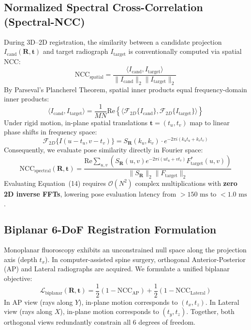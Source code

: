 \documentclass[journal,twocolumn]{IEEEtran}
\begin{document}
\subsection{Normalized Spectral Cross-Correlation (Spectral-NCC)}
During 3D--2D registration, the similarity between a candidate projection $I_{\mathrm{cand}}(\mathbf{R}, \mathbf{t})$ and target radiograph $I_{\mathrm{target}}$ is conventionally computed via spatial NCC:
\begin{equation}
\mathrm{NCC}_{\mathrm{spatial}} = \frac{\langle I_{\mathrm{cand}}, I_{\mathrm{target}} \rangle}{\|I_{\mathrm{cand}}\|_2 \|I_{\mathrm{target}}\|_2}
\end{equation}
By Parseval's Plancherel Theorem, spatial inner products equal frequency-domain inner products:
\begin{equation}
\langle I_{\mathrm{cand}}, I_{\mathrm{target}} \rangle = \frac{1}{M N} \mathrm{Re} \left\{ \langle \mathcal{F}_{2D}\{I_{\mathrm{cand}}\}, \mathcal{F}_{2D}\{I_{\mathrm{target}}\} \rangle \right\}
\end{equation}
Under rigid motion, in-plane spatial translations $\mathbf{t} = (t_u, t_v)$ map to linear phase shifts in frequency space:
\begin{equation}
\mathcal{F}_{2D}\{I(u - t_u, v - t_v)\} = S_{\mathbf{R}}(k_u, k_v) \cdot e^{-2\pi i (k_u t_u + k_v t_v)}
\end{equation}
Consequently, we evaluate pose similarity directly in Fourier space:
\begin{equation}
\mathrm{NCC}_{\mathrm{spectral}}(\mathbf{R}, \mathbf{t}) = \frac{\mathrm{Re} \sum_{u, v} \left( S_{\mathbf{R}}(u, v) e^{-2\pi i (u t_u + v t_v)} F_{\mathrm{target}}^*(u, v) \right)}{\|S_{\mathbf{R}}\|_2 \|F_{\mathrm{target}}\|_2}
\end{equation}
Evaluating Equation~(14) requires $\mathcal{O}(N^2)$ complex multiplications with \textbf{zero 2D inverse FFTs}, lowering pose evaluation latency from $>150\text{ ms}$ to $< 1.0\text{ ms}$.

\subsection{Biplanar 6-DoF Registration Formulation}
Monoplanar fluoroscopy exhibits an unconstrained null space along the projection axis (depth $t_x$). In computer-assisted spine surgery, orthogonal Anterior-Posterior (AP) and Lateral radiographs are acquired. We formulate a unified biplanar objective:
\begin{equation}
\mathcal{L}_{\mathrm{biplanar}}(\mathbf{R}, \mathbf{t}) = \frac{1}{2}\left(1 - \mathrm{NCC}_{\mathrm{AP}}\right) + \frac{1}{2}\left(1 - \mathrm{NCC}_{\mathrm{Lateral}}\right)
\end{equation}
In AP view (rays along $Y$), in-plane motion corresponds to $(t_x, t_z)$. In Lateral view (rays along $X$), in-plane motion corresponds to $(t_y, t_z)$. Together, both orthogonal views redundantly constrain all 6 degrees of freedom.
\end{document}
